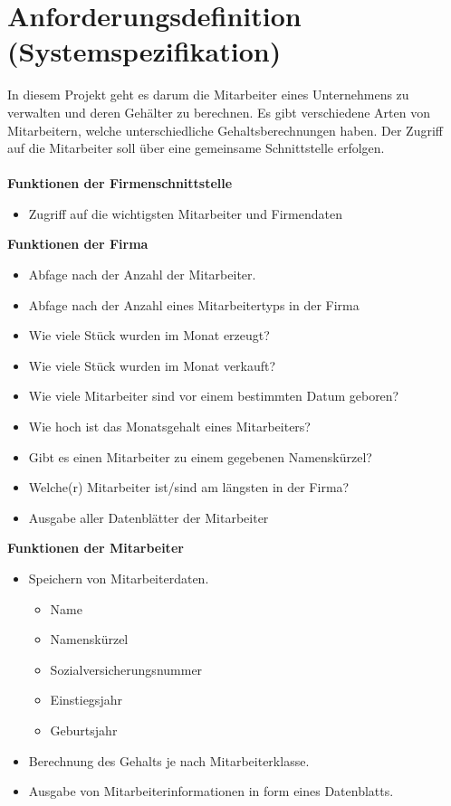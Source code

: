 \documentclass[12pt,naustrian,a4widepaper]{scrartcl}
\begin{document}
\clearpage
\section{Anforderungsdefinition (Systemspezifikation)}
In diesem Projekt geht es darum die Mitarbeiter eines Unternehmens zu verwalten und deren Gehälter zu berechnen.
Es gibt verschiedene Arten von Mitarbeitern, welche unterschiedliche Gehaltsberechnungen haben. 
Der Zugriff auf die Mitarbeiter soll über eine gemeinsame Schnittstelle erfolgen.
\\
\\
\textbf{Funktionen der Firmenschnittstelle}
\begin{itemize}
	\item Zugriff auf die wichtigsten Mitarbeiter und Firmendaten
\end{itemize}

\textbf{Funktionen der Firma}
\begin{itemize}
 \item Abfage nach der Anzahl der Mitarbeiter.
 \item Abfage nach der Anzahl eines Mitarbeitertyps in der Firma
 \item Wie viele Stück wurden im Monat erzeugt?
 \item Wie viele Stück wurden im Monat verkauft?
 \item Wie viele Mitarbeiter sind vor einem bestimmten Datum geboren?
 \item Wie hoch ist das Monatsgehalt eines Mitarbeiters?
 \item Gibt es einen Mitarbeiter zu einem gegebenen Namenskürzel?
 \item Welche(r) Mitarbeiter ist/sind am längsten in der Firma?
 \item Ausgabe aller Datenblätter der Mitarbeiter
\end{itemize}

\textbf{Funktionen der Mitarbeiter}
\begin{itemize}
	\item Speichern von Mitarbeiterdaten.
	\begin{itemize}
		\item Name
		\item Namenskürzel
		\item Sozialversicherungsnummer
		\item Einstiegsjahr
		\item Geburtsjahr
	\end{itemize}
	\item Berechnung des Gehalts je nach Mitarbeiterklasse.
	\item Ausgabe von Mitarbeiterinformationen in form eines Datenblatts.
\end{itemize}
\end{document}
